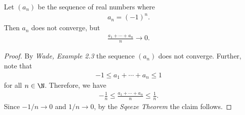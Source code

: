 \documentclass{article}
\begin{document}
\begin{claim}
   Let $(a_n)$ be the sequence of real numbers
   where
   \begin{align*}
      a_n = (-1)^n.
   \end{align*}
   Then $a_n$ does not converge, but
   \begin{align*}
      \frac{a_1+\cdots+a_n}{n} \to 0.
   \end{align*}
   \begin{proof}
      By \emph{Wade, Example 2.3} the sequence $(a_n)$ does not converge.
      Further, note that
      \begin{align*}
         -1 \leq a_1 + \cdots + a_n \leq 1
      \end{align*}
      for all $n\in\N$. Therefore, we have
      \begin{align*}
         -\frac{1}{n}\leq \frac{a_1+\cdots+a_n}{n} \leq \frac{1}{n}.
      \end{align*}
      Since $-1/n\to 0$ and $1/n\to 0$, by the \emph{Sqeeze Theorem} the claim follows.
   \end{proof}
\end{claim}
\end{document}
